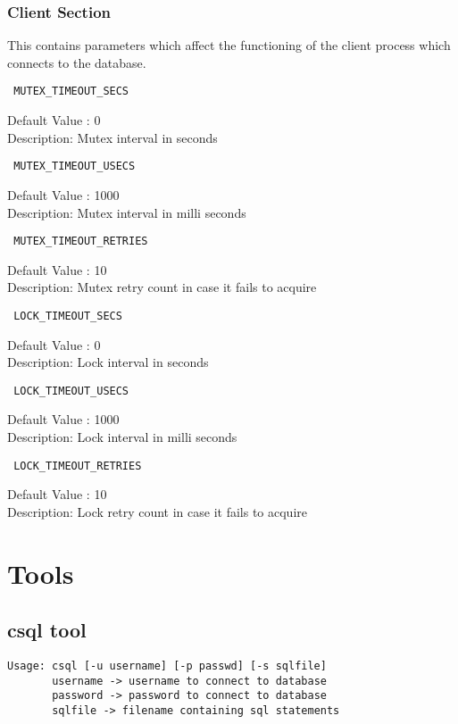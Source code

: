 \documentclass[12pt]{article}
\begin{document}
\subsubsection{Client Section}
\label{serversection}
This contains parameters which affect the functioning of the client process which connects to the database.

\begin{verbatim} MUTEX_TIMEOUT_SECS \end{verbatim}
Default Value : 0 \\
Description: Mutex interval in seconds

\begin{verbatim} MUTEX_TIMEOUT_USECS \end{verbatim}
Default Value : 1000 \\
Description: Mutex interval in milli seconds

\begin{verbatim} MUTEX_TIMEOUT_RETRIES \end{verbatim}
Default Value : 10 \\
Description: Mutex retry count in case it fails to acquire


\begin{verbatim} LOCK_TIMEOUT_SECS \end{verbatim}
Default Value : 0 \\
Description: Lock interval in seconds

\begin{verbatim} LOCK_TIMEOUT_USECS \end{verbatim}
Default Value : 1000 \\
Description: Lock interval in milli seconds

\begin{verbatim} LOCK_TIMEOUT_RETRIES \end{verbatim}
Default Value : 10 \\
Description: Lock retry count in case it fails to acquire

\section{Tools}
\label{tools}
\subsection{csql tool}
\label{csqltool}
\begin{verbatim}
Usage: csql [-u username] [-p passwd] [-s sqlfile] 
       username -> username to connect to database
       password -> password to connect to database
       sqlfile -> filename containing sql statements
\end{verbatim}
\end{document}
